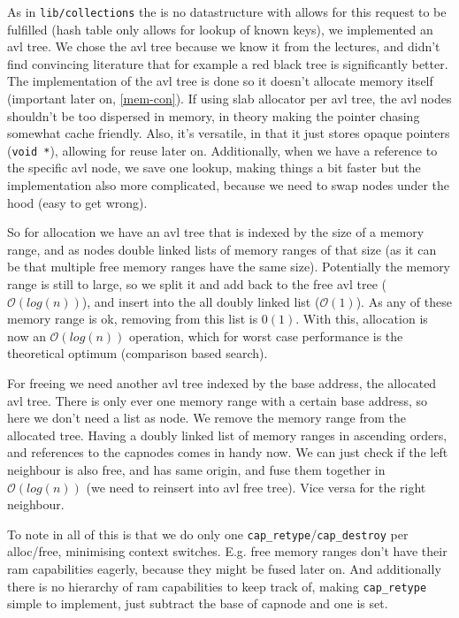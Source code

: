 As in \verb|lib/collections| the is no datastructure with allows for this
request to be fulfilled (hash table only allows for lookup of known keys), we
implemented an avl tree.
We chose the avl tree because we know it from the lectures, and didn't find
convincing literature that for example a red black tree is significantly better.
The implementation of the avl tree is done so it doesn't allocate memory itself
(important later on, \ref{mem-con}).
If using slab allocator per avl tree, the avl nodes shouldn't be too dispersed
in memory, in theory making the pointer chasing somewhat cache friendly.
Also, it's versatile, in that it just stores opaque pointers (\verb|void *|),
allowing for reuse later on.
Additionally, when we have a reference to the specific avl node, we save one
lookup, making things a bit faster but the implementation also more complicated,
because we need to swap nodes under the hood (easy to get wrong).

So for allocation we have an avl tree that is indexed by the size of a memory
range, and as nodes double linked lists of memory ranges of that size (as it
can be that multiple free memory ranges have the same size).
Potentially the memory range is still to large, so we split it and add back to
the free avl tree ($\mathcal{O}(log(n))$), and insert into the all doubly linked
list ($\mathcal{O}(1)$).
As any of these memory range is ok, removing from this list is $\mathcal{0}(1)$.
With this, allocation is now an $\mathcal{O}(log(n))$ operation, which for worst
case performance is the theoretical optimum (comparison based search).

For freeing we need another avl tree indexed by the base address, the allocated
avl tree.
There is only ever one memory range with a certain base address, so here we
don't need a list as node.
We remove the memory range from the allocated tree.
Having a doubly linked list of memory ranges in ascending orders, and references
to the capnodes comes in handy now.
We can just check if the left neighbour is also free, and has same origin, and
fuse them together in $\mathcal{O}(log(n))$ (we need to reinsert into avl free
tree).
Vice versa for the right neighbour.

To note in all of this is that we do only one
\verb|cap_retype|/\verb|cap_destroy| per alloc/free, minimising context
switches.
E.g. free memory ranges don't have their ram capabilities eagerly, because they
might be fused later on.
And additionally there is no hierarchy of ram capabilities to keep track of,
making \verb|cap_retype| simple to implement, just subtract the base of capnode
and one is set.


